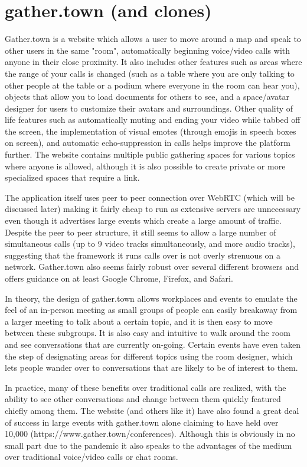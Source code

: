 \documentclass[bsc,frontabs,singlespacing,parskip,deptreport]{infthesis}
\begin{document}
\section{gather.town (and clones)}

Gather.town is a website which allows a user to move around a map and speak to other users in the same "room", automatically beginning voice/video calls with anyone in their close proximity.  It also includes other features such as areas where the range of your calls is changed (such as a table where you are only talking to other people at the table or a podium where everyone in the room can hear you), objects that allow you to load documents for others to see, and a space/avatar designer for users to customize their avatars and surroundings.  Other quality of life features such as automatically muting and ending your video while tabbed off the screen, the implementation of visual emotes (through emojis in speech boxes on screen), and automatic echo-suppression in calls helps improve the platform further.  The website contains multiple public gathering spaces for various topics where anyone is allowed, although it is also possible to create private or more specialized spaces that require a link.

The application itself uses peer to peer connection over WebRTC (which will be discussed later) making it fairly cheap to run as extensive servers are unnecessary even though it advertises large events which create a large amount of traffic.  Despite the peer to peer structure, it still seems to allow a large number of simultaneous calls (up to 9 video tracks simultaneously, and more audio tracks), suggesting that the framework it runs calls over is not overly strenuous on a network.  Gather.town also seems fairly robust over several different browsers and offers guidance on at least Google Chrome, Firefox, and Safari.

In theory, the design of gather.town allows workplaces and events to emulate the feel of an in-person meeting as small groups of people can easily breakaway from a larger meeting to talk about a certain topic, and it is then easy to move between these subgroups.  It is also easy and intuitive to walk around the room and see conversations that are currently on-going.  Certain events have even taken the step of designating areas for different topics using the room designer, which lets people wander over to conversations that are likely to be of interest to them.

In practice, many of these benefits over traditional calls are realized, with the ability to see other conversations and change between them quickly featured chiefly among them.  The website (and others like it) have also found a great deal of success in large events with gather.town alone claiming to have held over 10,000 (https://www.gather.town/conferences).   Although this is obviously in no small part due to the pandemic it also speaks to the advantages of the medium over traditional voice/video calls or chat rooms.
\end{document}
